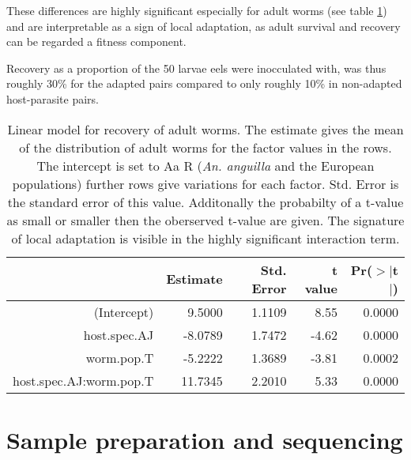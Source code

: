 These differences are highly significant especially for adult worms
(see table \ref{tab:ad-sig}) and are interpretable as a sign of local
adaptation, as adult survival and recovery can be regarded a fitness
component.

Recovery as a proportion of the 50 larvae eels were inocculated with,
was thus roughly 30\% for the adapted pairs compared to only roughly
10\% in non-adapted host-parasite pairs.

\begin{table}[ht]
\begin{center}
\begin{tabular}{rrrrr}
  \hline
 & Estimate & Std. Error & t value & Pr($>$$|$t$|$) \\ 
  \hline
  (Intercept) & 9.5000 & 1.1109 & 8.55 & 0.0000 \\ 
  host.spec.AJ & -8.0789 & 1.7472 & -4.62 & 0.0000 \\ 
  worm.pop.T & -5.2222 & 1.3689 & -3.81 & 0.0002 \\ 
  host.spec.AJ:worm.pop.T & 11.7345 & 2.2010 & 5.33 & 0.0000 \\ 
   \hline
\end{tabular}
\caption[Linear model for recovery]{Linear model for recovery of adult
  worms. The estimate gives the mean of the distribution of adult
  worms for the factor values in the rows. The intercept is set to Aa
  R (\textit{An. anguilla} and the European populations) further rows
  give variations for each factor. Std. Error is the standard error of
  this value. Additonally the probabilty of a t-value as small or
  smaller then the oberserved t-value are given. The signature of
  local adaptation is visible in the highly significant interaction
  term.}
\label{tab:ad-sig}
\end{center}
\end{table}
\afterpage{\clearpage}

\section{Sample preparation and sequencing }

